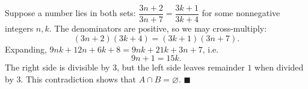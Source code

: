 Suppose a number lies in both sets: $\dfrac{3n+2}{3n+7}=\dfrac{3k+1}{3k+4}$ for some nonnegative integers $n,k$. The denominators are positive, so we may cross-multiply:
\[(3n+2)(3k+4)=(3k+1)(3n+7).\]
Expanding, $9nk+12n+6k+8=9nk+21k+3n+7$, i.e.
\[9n+1=15k.\]
The right side is divisible by $3$, but the left side leaves remainder $1$ when divided by $3$. This contradiction shows that $A\cap B=\varnothing$. $\blacksquare$
